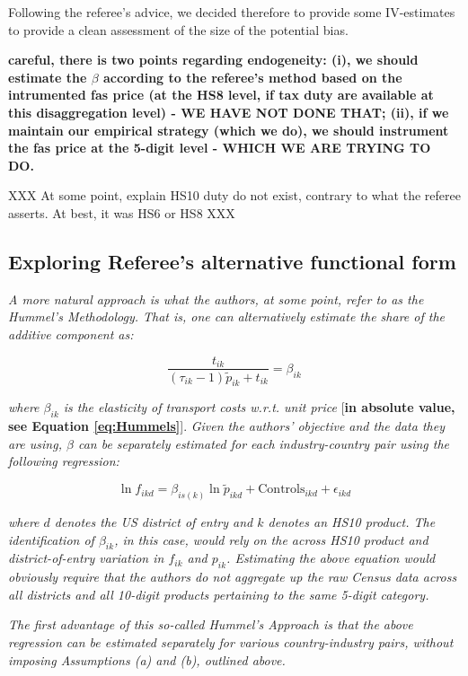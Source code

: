 \documentclass[a4paper,12pt]{article}
\begin{document}
Following the referee's advice, we decided therefore to provide some IV-estimates to provide a clean assessment of the size of the potential bias.

\textbf{careful, there is two points regarding endogeneity: (i), we should estimate the $\beta$ according to the referee's method based on the intrumented fas price (at the HS8 level, if tax duty are available at this disaggregation level) - WE HAVE NOT DONE THAT; (ii), if we maintain our empirical strategy (which we do), we should instrument the fas price at the 5-digit level - WHICH WE ARE TRYING TO DO.}



XXX At some point, explain HS10 duty do not exist, contrary to what the referee asserts. At best, it was HS6 or HS8 XXX


\subsection{Exploring Referee's alternative functional form}


\textit{A more natural approach is what the authors, at some point, refer to as the
Hummel's Methodology. That is, one can alternatively estimate the share of the
additive component as:}

$$\frac{t_{ik}}{ (\tau_{ik}-1)\tilde{p}_{ik} + t_{ik}} = \beta_{ik}$$

\textit{where $\beta_{ik}$ is the elasticity of transport costs w.r.t. unit price} [\textbf{in absolute value, see Equation \ref{eq:Hummels}}]. \textit{Given the authors' objective and the data they are using, $\beta$ can be separately estimated
for each industry-country pair using the following regression:}

\begin{equation}
\ln f_{ikd} = \beta_{is(k)}\ln \tilde{p}_{ikd} + \text{Controls}_{ikd} +\epsilon_{ikd} \label{eq:estimation_ref1}
\end{equation}

\textit{where $d$ denotes the US district of entry and $k$ denotes an HS10 product. The
identification of $\beta_{ik}$, in this case, would rely on the across HS10 product and
district-of-entry variation in $f_{ik}$ and $p_{ik}$. Estimating the above equation would
obviously require that the authors do not aggregate up the raw Census data
across all districts and all 10-digit products pertaining to the same 5-digit category.}

\textit{The first advantage of this so-called Hummel's Approach is that the above
regression can be estimated separately for various country-industry pairs, without
imposing Assumptions (a) and (b), outlined above.}
\end{document}

